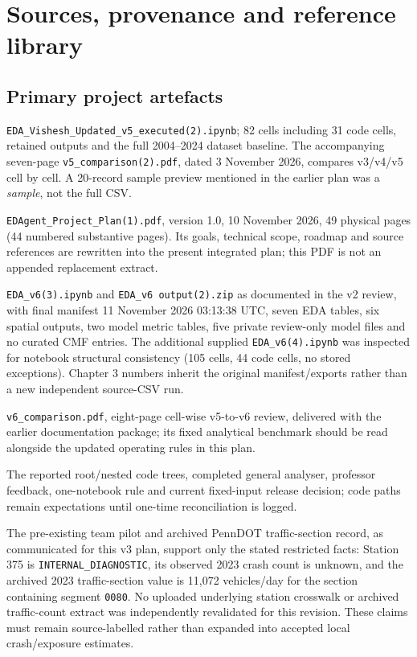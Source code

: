 \documentclass[11pt,a4paper,openany]{report}
\newcommand{\pathcode}[1]{\nolinkurl{#1}}
\begin{document}
\chapter{Sources, provenance and reference library}
\section{Primary project artefacts}
\begin{description}[style=nextline,leftmargin=0pt,labelwidth=0pt,itemsep=5pt]
\item[B1 -- Earlier analytical baseline.] \pathcode{EDA_Vishesh_Updated_v5_executed(2).ipynb}; 82 cells including 31 code cells, retained outputs and the full 2004--2024 dataset baseline. The accompanying seven-page \pathcode{v5_comparison(2).pdf}, dated 3 November 2026, compares v3/v4/v5 cell by cell. A 20-record sample preview mentioned in the earlier plan was a \emph{sample}, not the full CSV.
\item[B2 -- Original planning record.] \pathcode{EDAgent_Project_Plan(1).pdf}, version 1.0, 10 November 2026, 49 physical pages (44 numbered substantive pages). Its goals, technical scope, roadmap and source references are rewritten into the present integrated plan; this PDF is not an appended replacement extract.
\item[B3 -- Frozen executed v6 evidence.] \pathcode{EDA_v6(3).ipynb} and \pathcode{EDA_v6 output(2).zip} as documented in the v2 review, with final manifest 11 November 2026 03:13:38 UTC, seven EDA tables, six spatial outputs, two model metric tables, five private review-only model files and no curated CMF entries. The additional supplied \pathcode{EDA_v6(4).ipynb} was inspected for notebook structural consistency (105 cells, 44 code cells, no stored exceptions). Chapter 3 numbers inherit the original manifest/exports rather than a new independent source-CSV run.
\item[B4 -- Companion report.] \pathcode{v6_comparison.pdf}, eight-page cell-wise v5-to-v6 review, delivered with the earlier documentation package; its fixed analytical benchmark should be read alongside the updated operating rules in this plan.
\item[B5 -- Team/repository context.] The reported root/nested code trees, completed general analyser, professor feedback, one-notebook rule and current fixed-input release decision; code paths remain expectations until one-time reconciliation is logged.
\item[B6 -- Station 375 and traffic-section evidence.] The pre-existing team pilot and archived PennDOT traffic-section record, as communicated for this v3 plan, support only the stated restricted facts: Station 375 is \pathcode{INTERNAL_DIAGNOSTIC}, its observed 2023 crash count is unknown, and the archived 2023 traffic-section value is 11,072 vehicles/day for the section containing segment \pathcode{0080}. No uploaded underlying station crosswalk or archived traffic-count extract was independently revalidated for this revision. These claims must remain source-labelled rather than expanded into accepted local crash/exposure estimates.
\end{description}
\end{document}
